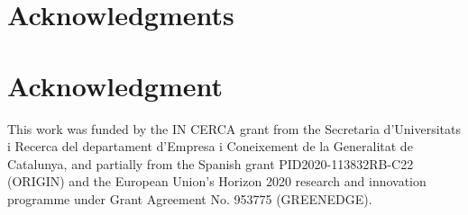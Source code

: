 \documentclass[10pt,journal,compsoc]{IEEEtran}
\begin{document}
%


\ifCLASSOPTIONcompsoc
  \section*{Acknowledgments}
\else
  \section*{Acknowledgment}
\fi


This work was funded by the IN CERCA grant from the Secretaria d'Universitats i Recerca del departament d'Empresa i Coneixement de la Generalitat de Catalunya, and partially from the Spanish grant PID2020-113832RB-C22 (ORIGIN) and the European Union’s Horizon 2020 research and innovation programme under Grant Agreement No. 953775 (GREENEDGE). 

\ifCLASSOPTIONcaptionsoff
  \newpage
\fi



%
%
%


\end{document}

